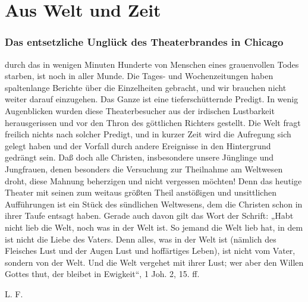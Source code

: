 \chapter{Aus Welt und Zeit}

\subsection[Das entsetzliche Unglück]{Das entsetzliche Unglück des Theaterbrandes in Chicago}

durch das in wenigen Minuten Hunderte von Menschen eines grauenvollen Todes starben, ist noch in aller Munde. Die Tages- und Wochenzeitungen haben spaltenlange Berichte über die Einzelheiten gebracht, und wir brauchen nicht weiter darauf einzugehen. Das Ganze ist eine tieferschütternde Predigt. In wenig Augenblicken wurden diese Theaterbesucher aus der irdischen Lustbarkeit herausgerissen und vor den Thron des göttlichen Richters gestellt. Die Welt fragt freilich nichts nach solcher Predigt, und in kurzer Zeit wird die Aufregung sich gelegt haben und der Vorfall durch andere Ereignisse in den Hintergrund gedrängt sein. Daß doch alle Christen, insbesondere unsere Jünglinge und Jungfrauen, denen besonders die Versuchung zur Theilnahme am Weltwesen droht, diese Mahnung beherzigen und nicht vergessen möchten! Denn das heutige Theater mit seinen zum weitaus größten Theil anstößigen und unsittlichen Aufführungen ist ein Stück des sündlichen Weltwesens, dem die Christen schon in ihrer Taufe entsagt haben. Gerade auch davon gilt das Wort der Schrift: „Habt nicht lieb die Welt, noch was in der Welt ist. So jemand die Welt lieb hat, in dem ist nicht die Liebe des Vaters. Denn alles, was in der Welt ist (nämlich des Fleisches Lust und der Augen Lust und hoffärtiges Leben), ist nicht vom Vater, sondern von der Welt. Und die Welt vergehet mit ihrer Lust; wer aber den Willen Gottes thut, der bleibet in Ewigkeit“, 1 Joh. 2, 15. ff.

L. F.
